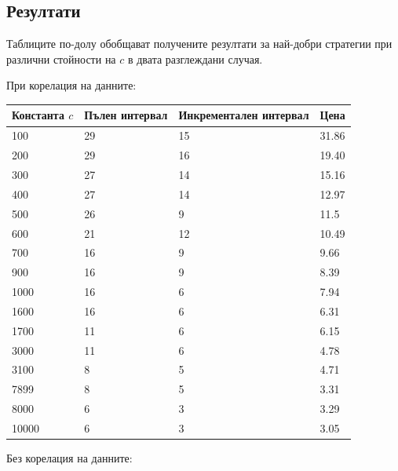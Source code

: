 \documentclass[11pt, a4paper]{article}
\theoremstyle{definition}
\begin{document}
	\subsection{Резултати}
			Таблиците по-долу обобщават получените резултати за най-добри стратегии при различни стойности на $c$ в двата разглеждани случая.\par
			При корелация на данните:
			\begin{center}\label{table_corr}
			\begin{tabular}{| l | l | l | l |}
				\hline
				Константа $c$ & Пълен интервал & Инкрементален интервал & Цена\\ \hline
				100 & 29 & 15 & 31.86\\ \hline
				200 & 29 & 16 & 19.40\\ \hline
				300 & 27 & 14 & 15.16\\ \hline
				400 & 27 & 14 & 12.97\\ \hline
				500 & 26 & 9 & 11.5\\ \hline
				600 & 21 & 12 & 10.49\\ \hline
				700 & 16 & 9 & 9.66\\ \hline
				900 & 16 & 9 & 8.39\\ \hline
				1000 & 16 & 6 & 7.94\\ \hline
				1600 & 16 & 6 & 6.31\\ \hline
				1700 & 11 & 6 & 6.15\\ \hline
				3000 & 11 & 6 & 4.78\\ \hline
				3100 & 8 & 5 & 4.71\\ \hline
				7899 & 8 & 5 & 3.31\\ \hline
				8000 & 6 & 3 & 3.29\\ \hline
				10000 & 6 & 3 & 3.05\\ \hline
			\end{tabular}
			\end{center}
		Без корелация на данните:
\end{document}
